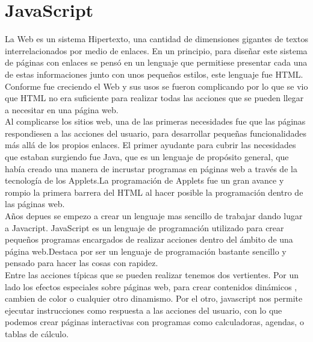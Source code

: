 \section{JavaScript}
La Web es un sistema Hipertexto, una cantidad de dimensiones gigantes de textos interrelacionados por medio de enlaces. En un principio, para diseñar este sistema de páginas con enlaces se pensó en un lenguaje que permitiese presentar cada una de estas informaciones junto con unos pequeños estilos, este lenguaje fue HTML. 
\\Conforme fue creciendo el Web y sus usos se fueron complicando por lo que se vio que HTML no era suficiente para realizar todas las acciones que se pueden llegar a necesitar en una página web. 
\\Al complicarse los sitios web, una de las primeras necesidades fue que las páginas respondiesen a las acciones del usuario, para desarrollar pequeñas funcionalidades más allá de los propios enlaces. El primer ayudante para cubrir las necesidades que estaban surgiendo fue Java, que es un lenguaje de propósito general, que había creado una manera de incrustar programas en páginas web a través de la tecnología de los Applets.La programación de Applets fue un gran avance y rompio la primera barrera del HTML al hacer posible la programación dentro de las páginas web.
\\Años depues se empezo a crear un lenguaje mas sencillo de trabajar dando lugar a Javacript. JavaScript es un lenguaje de programación utilizado para crear pequeños programas encargados de realizar acciones dentro del ámbito de una página web.Destaca por ser un lenguaje de programación bastante sencillo y pensado para hacer las cosas con rapidez.
\\Entre las acciones típicas que se pueden realizar  tenemos dos vertientes. Por un lado los efectos especiales sobre páginas web, para crear contenidos dinámicos , cambien de color o cualquier otro dinamismo. Por el otro, javascript nos permite ejecutar instrucciones como respuesta a las acciones del usuario, con lo que podemos crear páginas interactivas con programas como calculadoras, agendas, o tablas de cálculo.  
